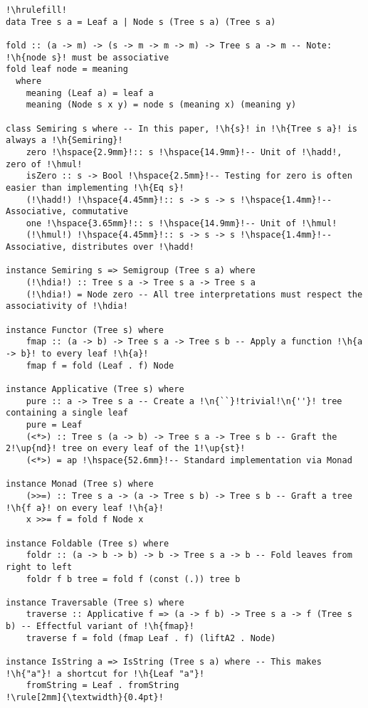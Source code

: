 \documentclass[english,submission]{programming}
\newcommand{\code}[1]{\lstinline[mathescape]|#1|}
\newcommand{\h}[1]{{\itshape\color{grayblue}#1}} %
\newcommand{\n}[1]{{\itshape\color{graygreen}#1}} %
\newcommand{\up}[1]{{\itshape\color{graygreen}\textsuperscript{#1}}}
\newcommand{\hadd}{{\large\color{darkblue} $\oplus$}}
\newcommand{\hmul}{{\large\color{darkblue} $\otimes$}}
\newcommand{\hdia}{\,\text{\raisebox{-0.2mm}{\Large\color{darkblue} $\diamond$}}\,}
\begin{document}
\begin{lstlisting}[float,label=lst-tree-std,xleftmargin=0pt,caption={
    The \code{Tree} data type and instances of various standard Haskell type classes.
}]
!\hrulefill!
data Tree s a = Leaf a | Node s (Tree s a) (Tree s a)

fold :: (a -> m) -> (s -> m -> m -> m) -> Tree s a -> m -- Note: !\h{node s}! must be associative
fold leaf node = meaning
  where
    meaning (Leaf a) = leaf a
    meaning (Node s x y) = node s (meaning x) (meaning y)

class Semiring s where -- In this paper, !\h{s}! in !\h{Tree s a}! is always a !\h{Semiring}!
    zero !\hspace{2.9mm}!:: s !\hspace{14.9mm}!-- Unit of !\hadd!, zero of !\hmul!
    isZero :: s -> Bool !\hspace{2.5mm}!-- Testing for zero is often easier than implementing !\h{Eq s}!
    (!\hadd!) !\hspace{4.45mm}!:: s -> s -> s !\hspace{1.4mm}!-- Associative, commutative
    one !\hspace{3.65mm}!:: s !\hspace{14.9mm}!-- Unit of !\hmul!
    (!\hmul!) !\hspace{4.45mm}!:: s -> s -> s !\hspace{1.4mm}!-- Associative, distributes over !\hadd!

instance Semiring s => Semigroup (Tree s a) where
    (!\hdia!) :: Tree s a -> Tree s a -> Tree s a
    (!\hdia!) = Node zero -- All tree interpretations must respect the associativity of !\hdia!

instance Functor (Tree s) where
    fmap :: (a -> b) -> Tree s a -> Tree s b -- Apply a function !\h{a -> b}! to every leaf !\h{a}!
    fmap f = fold (Leaf . f) Node

instance Applicative (Tree s) where
    pure :: a -> Tree s a -- Create a !\n{``}!trivial!\n{''}! tree containing a single leaf
    pure = Leaf
    (<*>) :: Tree s (a -> b) -> Tree s a -> Tree s b -- Graft the 2!\up{nd}! tree on every leaf of the 1!\up{st}!
    (<*>) = ap !\hspace{52.6mm}!-- Standard implementation via Monad

instance Monad (Tree s) where
    (>>=) :: Tree s a -> (a -> Tree s b) -> Tree s b -- Graft a tree !\h{f a}! on every leaf !\h{a}!
    x >>= f = fold f Node x

instance Foldable (Tree s) where
    foldr :: (a -> b -> b) -> b -> Tree s a -> b -- Fold leaves from right to left
    foldr f b tree = fold f (const (.)) tree b

instance Traversable (Tree s) where
    traverse :: Applicative f => (a -> f b) -> Tree s a -> f (Tree s b) -- Effectful variant of !\h{fmap}!
    traverse f = fold (fmap Leaf . f) (liftA2 . Node)

instance IsString a => IsString (Tree s a) where -- This makes !\h{"a"}! a shortcut for !\h{Leaf "a"}!
    fromString = Leaf . fromString
!\rule[2mm]{\textwidth}{0.4pt}!
\end{lstlisting}
\end{document}
